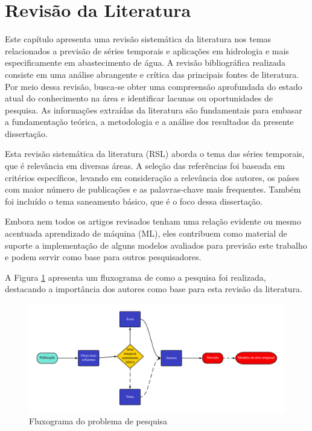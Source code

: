 \section{Revis\~ao da Literatura}\label{sec:refteo}


Este capítulo apresenta uma revisão sistemática  da literatura nos temas relacionados a previsão de séries temporais e aplicações em hidrologia e mais especificamente em abastecimento de água. A revisão bibliográfica realizada consiste em uma análise abrangente e crítica das principais fontes de literatura. Por meio dessa revisão, busca-se obter uma compreensão aprofundada do estado atual do conhecimento na área e identificar lacunas ou oportunidades de pesquisa. As informações extraídas da literatura são fundamentais para embasar a fundamentação teórica, a metodologia e a análise dos resultados da presente dissertação.

Esta revisão sistemática da literatura (RSL) aborda o tema das séries temporais, que é relevância em diversas áreas. A seleção das referências foi baseada em critérios específicos, levando em consideração a relevância dos autores, os países com maior número de publicações e as palavras-chave mais frequentes. Também foi incluído o tema saneamento básico, que é o foco dessa dissertação.

Embora nem todos os artigos revisados tenham uma relação evidente ou mesmo acentuada aprendizado de máquina (ML), eles contribuem como material de suporte a implementação de alguns modelos avaliados para previsão este trabalho e podem servir como base para outros pesquisadores.

A Figura \ref{fig:serie-temporal} apresenta um fluxograma de como a pesquisa foi realizada, destacando a importância dos autores como base para esta revisão da literatura. 

\begin{figure}[H]
	\centering
	\caption{Fluxograma do problema de pesquisa}
	\label{fig:serie-temporal}
	\includegraphics[width=\linewidth]{Revisao/Figuras/serie_temporal}
	
	
\end{figure}

